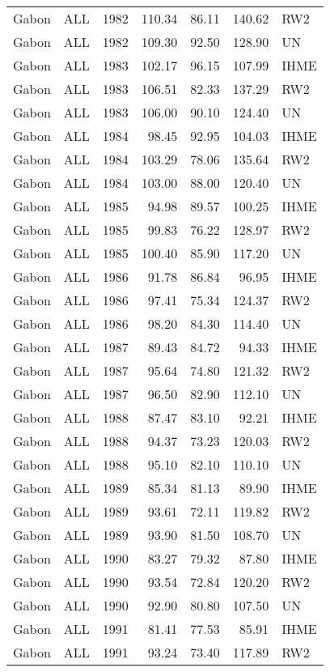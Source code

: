 \begin{longtable}{lllrrrl}
  Gabon & ALL & 1982 & 110.34 & 86.11 & 140.62 & RW2 \\ 
  Gabon & ALL & 1982 & 109.30 & 92.50 & 128.90 & UN \\ 
  Gabon & ALL & 1983 & 102.17 & 96.15 & 107.99 & IHME \\ 
  Gabon & ALL & 1983 & 106.51 & 82.33 & 137.29 & RW2 \\ 
  Gabon & ALL & 1983 & 106.00 & 90.10 & 124.40 & UN \\ 
  Gabon & ALL & 1984 & 98.45 & 92.95 & 104.03 & IHME \\ 
  Gabon & ALL & 1984 & 103.29 & 78.06 & 135.64 & RW2 \\ 
  Gabon & ALL & 1984 & 103.00 & 88.00 & 120.40 & UN \\ 
  Gabon & ALL & 1985 & 94.98 & 89.57 & 100.25 & IHME \\ 
  Gabon & ALL & 1985 & 99.83 & 76.22 & 128.97 & RW2 \\ 
  Gabon & ALL & 1985 & 100.40 & 85.90 & 117.20 & UN \\ 
  Gabon & ALL & 1986 & 91.78 & 86.84 & 96.95 & IHME \\ 
  Gabon & ALL & 1986 & 97.41 & 75.34 & 124.37 & RW2 \\ 
  Gabon & ALL & 1986 & 98.20 & 84.30 & 114.40 & UN \\ 
  Gabon & ALL & 1987 & 89.43 & 84.72 & 94.33 & IHME \\ 
  Gabon & ALL & 1987 & 95.64 & 74.80 & 121.32 & RW2 \\ 
  Gabon & ALL & 1987 & 96.50 & 82.90 & 112.10 & UN \\ 
  Gabon & ALL & 1988 & 87.47 & 83.10 & 92.21 & IHME \\ 
  Gabon & ALL & 1988 & 94.37 & 73.23 & 120.03 & RW2 \\ 
  Gabon & ALL & 1988 & 95.10 & 82.10 & 110.10 & UN \\ 
  Gabon & ALL & 1989 & 85.34 & 81.13 & 89.90 & IHME \\ 
  Gabon & ALL & 1989 & 93.61 & 72.11 & 119.82 & RW2 \\ 
  Gabon & ALL & 1989 & 93.90 & 81.50 & 108.70 & UN \\ 
  Gabon & ALL & 1990 & 83.27 & 79.32 & 87.80 & IHME \\ 
  Gabon & ALL & 1990 & 93.54 & 72.84 & 120.20 & RW2 \\ 
  Gabon & ALL & 1990 & 92.90 & 80.80 & 107.50 & UN \\ 
  Gabon & ALL & 1991 & 81.41 & 77.53 & 85.91 & IHME \\ 
  Gabon & ALL & 1991 & 93.24 & 73.40 & 117.89 & RW2 \\ 

\end{longtable}
